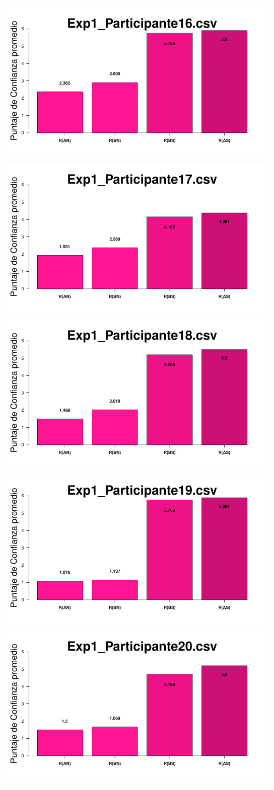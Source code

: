 \documentclass[a4paper ]{article}
\begin{document}
\begin{figure}[th]
\begin{center}
\includegraphics[width=8cm, height=4cm]{Figures/MirrorRating_Exp1_P16} \includegraphics[width=8cm, height=4cm]{Figures/MirrorRating_Exp1_P17} \includegraphics[width=8cm, height=4cm]{Figures/MirrorRating_Exp1_P18}
\includegraphics[width=8cm, height=4cm]{Figures/MirrorRating_Exp1_P19} \includegraphics[width=8cm, height=4cm]{Figures/MirrorRating_Exp1_P20} 
\end{center}
\end{figure}
\clearpage
\end{document}
